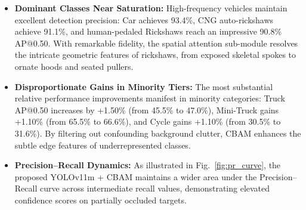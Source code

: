 \documentclass[pdflatex,sn-mathphys]{sn-jnl}
\begin{document}
\begin{table}[t]
\caption{Detailed Class-Wise Average Precision (AP@0.50) Breakdown and Performance Gain}\label{tab:per_class}
\end{table}

\begin{itemize}
    \item \textbf{Dominant Classes Near Saturation:} High-frequency vehicles maintain excellent detection precision: Car achieves 93.4\%, CNG auto-rickshaws achieve 91.1\%, and human-pedaled Rickshaws reach an impressive 90.8\% AP@0.50. With remarkable fidelity, the spatial attention sub-module resolves the intricate geometric features of rickshaws, from exposed skeletal spokes to ornate hoods and seated pullers.
    \item \textbf{Disproportionate Gains in Minority Tiers:} The most substantial relative performance improvements manifest in minority categories: Truck AP@0.50 increases by +1.50\% (from 45.5\% to 47.0\%), Mini-Truck gains +1.10\% (from 65.5\% to 66.6\%), and Cycle gains +1.10\% (from 30.5\% to 31.6\%). By filtering out confounding background clutter, CBAM enhances the subtle edge features of underrepresented classes.
    \item \textbf{Precision--Recall Dynamics:} As illustrated in Fig.~\ref{fig:pr_curve}, the proposed YOLOv11m + CBAM maintains a wider area under the Precision--Recall curve across intermediate recall values, demonstrating elevated confidence scores on partially occluded targets.
\end{itemize}
\end{document}
